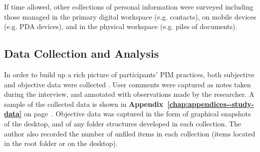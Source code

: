 If time allowed, other collections of personal information were surveyed including those managed in the primary digital workspace (e.g. contacts), on mobile devices (e.g. PDA devices), and in the physical workspace (e.g. piles of documents).








\subsection{Data Collection and Analysis}
\label{exp-study:data-analysis}

In order to build up a rich picture of participants' PIM practices, both subjective and objective data were collected .  User comments were captured as notes taken during the interview, and annotated with observations made by the researcher. A sample of the collected data is shown in \textbf{Appendix~\ref{chap:appendices--study-data}} on page~\pageref{chap:appendices--study-data:exp-study}.
Objective data was captured in the form of graphical snapshots of the desktop, and of any folder structures developed in each collection.  The author also recorded the number of unfiled items in each collection (items located in the root folder or on the desktop).


